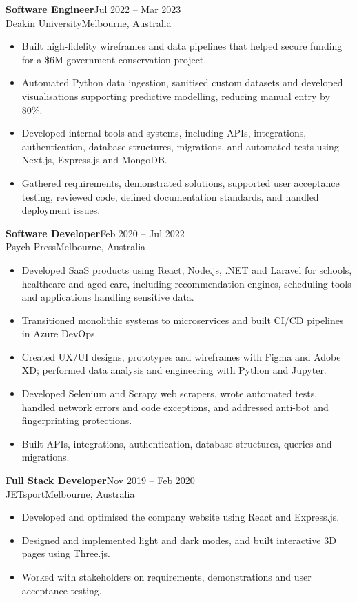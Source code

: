 \documentclass[11pt,a4paper]{article}
\newcommand{\role}[4]{\Needspace{6\baselineskip}\textbf{#1}\hfill{\small #2}\\{\color{muted}#3\hfill #4}\par}
\begin{document}
\role{Software Engineer}{Jul 2022 -- Mar 2023}{Deakin University}{Melbourne, Australia}
\begin{itemize}
\item Built high-fidelity wireframes and data pipelines that helped secure funding for a \$6M government conservation project.
\item Automated Python data ingestion, sanitised custom datasets and developed visualisations supporting predictive modelling, reducing manual entry by 80\%.
\item Developed internal tools and systems, including APIs, integrations, authentication, database structures, migrations, and automated tests using Next.js, Express.js and MongoDB.
\item Gathered requirements, demonstrated solutions, supported user acceptance testing, reviewed code, defined documentation standards, and handled deployment issues.
\end{itemize}

\role{Software Developer}{Feb 2020 -- Jul 2022}{Psych Press}{Melbourne, Australia}
\begin{itemize}
\item Developed SaaS products using React, Node.js, .NET and Laravel for schools, healthcare and aged care, including recommendation engines, scheduling tools and applications handling sensitive data.
\item Transitioned monolithic systems to microservices and built CI/CD pipelines in Azure DevOps.
\item Created UX/UI designs, prototypes and wireframes with Figma and Adobe XD; performed data analysis and engineering with Python and Jupyter.
\item Developed Selenium and Scrapy web scrapers, wrote automated tests, handled network errors and code exceptions, and addressed anti-bot and fingerprinting protections.
\item Built APIs, integrations, authentication, database structures, queries and migrations.
\end{itemize}

\role{Full Stack Developer}{Nov 2019 -- Feb 2020}{JETsport}{Melbourne, Australia}
\begin{itemize}
\item Developed and optimised the company website using React and Express.js.
\item Designed and implemented light and dark modes, and built interactive 3D pages using Three.js.
\item Worked with stakeholders on requirements, demonstrations and user acceptance testing.
\end{itemize}
\end{document}

